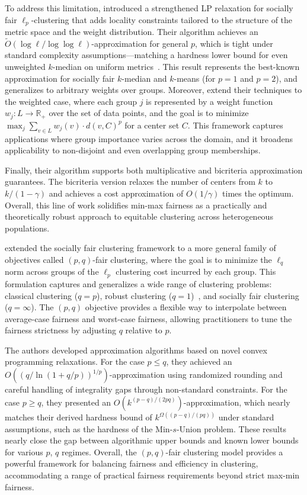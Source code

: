To address this limitation, \citep{makarychev2021approximation} introduced a strengthened LP relaxation for socially fair $\ell_p$-clustering that adds locality constraints tailored to the structure of the metric space and the weight distribution. Their algorithm achieves an $\tilde{O}(\log \ell / \log \log \ell)$-approximation for general $p$, which is tight under standard complexity assumptions—matching a hardness lower bound for even unweighted $k$-median on uniform metrics~\cite{bhattacharya2014new}. This result represents the best-known approximation for socially fair $k$-median and $k$-means (for $p = 1$ and $p = 2$), and generalizes to arbitrary weights over groups. Moreover, \citep{makarychev2021approximation} extend their techniques to the weighted case, where each group $j$ is represented by a weight function $w_j : L \rightarrow \mathbb{R}_+$ over the set of data points, and the goal is to minimize $\max_j \sum_{v \in L} w_j(v) \cdot d(v, C)^p$ for a center set $C$. This framework captures applications where group importance varies across the domain, and it broadens applicability to non-disjoint and even overlapping group memberships.

Finally, their algorithm supports both multiplicative and bicriteria approximation guarantees. The bicriteria version relaxes the number of centers from $k$ to $k/(1-\gamma)$ and achieves a cost approximation of $O(1/\gamma)$ times the optimum. Overall, this line of work solidifies min-max fairness as a practically and theoretically robust approach to equitable clustering across heterogeneous populations.

\cite{DBLP:conf/soda/ChlamtacMV22} extended the socially fair clustering framework to a more general family of objectives called $(p, q)$-fair clustering, where the goal is to minimize the $\ell_q$ norm across groups of the $\ell_p$ clustering cost incurred by each group. This formulation captures and generalizes a wide range of clustering problems: classical clustering ($q = p$), robust clustering ($q = 1$)~\cite{anthony2010plant}, and socially fair clustering ($q = \infty$). The $(p, q)$ objective provides a flexible way to interpolate between average-case fairness and worst-case fairness, allowing practitioners to tune the fairness strictness by adjusting $q$ relative to $p$.

The authors developed approximation algorithms based on novel convex programming relaxations. For the case $p \leq q$, they achieved an $O((q / \ln(1 + q/p))^{1/p})$-approximation using randomized rounding and careful handling of integrality gaps through non-standard constraints. For the case $p \geq q$, they presented an $O(k^{(p-q)/(2pq)})$-approximation, which nearly matches their derived hardness bound of $k^{\Omega((p-q)/(pq))}$ under standard assumptions, such as the hardness of the Min-$s$-Union problem. These results nearly close the gap between algorithmic upper bounds and known lower bounds for various $p$, $q$ regimes. Overall, the $(p, q)$-fair clustering model provides a powerful framework for balancing fairness and efficiency in clustering, accommodating a range of practical fairness requirements beyond strict max-min fairness.

